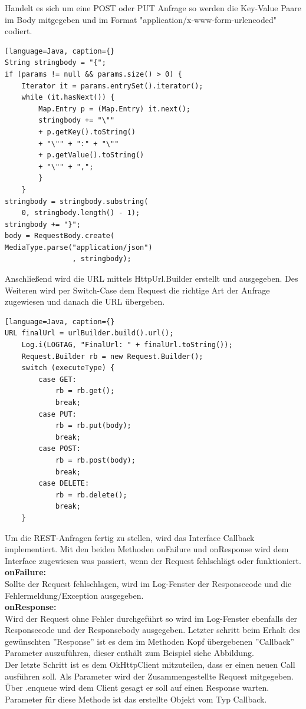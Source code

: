 Handelt es sich um eine POST oder PUT Anfrage so werden die Key-Value Paare im Body mitgegeben und im Format "application/x-www-form-urlencoded" codiert.
\begin{lstlisting}[language=Java, caption={}
String stringbody = "{";
if (params != null && params.size() > 0) {
  	Iterator it = params.entrySet().iterator();
    while (it.hasNext()) {
       	Map.Entry p = (Map.Entry) it.next();
        stringbody += "\"" 
        + p.getKey().toString() 
        + "\"" + ":" + "\"" 
        + p.getValue().toString() 
        + "\"" + ",";
        }
    }
stringbody = stringbody.substring(
  	0, stringbody.length() - 1);
stringbody += "}";
body = RequestBody.create(
MediaType.parse("application/json")
       			, stringbody);
\end{lstlisting}
Anschließend wird die URL mittels HttpUrl.Builder erstellt und ausgegeben. 
Des Weiteren wird per Switch-Case dem Request die richtige Art der Anfrage zugewiesen und danach die URL übergeben. 
\begin{lstlisting}[language=Java, caption={}
URL finalUrl = urlBuilder.build().url();
    Log.i(LOGTAG, "FinalUrl: " + finalUrl.toString());
    Request.Builder rb = new Request.Builder();
    switch (executeType) {
        case GET:
            rb = rb.get();
            break;
        case PUT:
            rb = rb.put(body);
            break;
        case POST:
            rb = rb.post(body);
            break;
        case DELETE:
            rb = rb.delete();
            break;
    }
\end{lstlisting}
Um die REST-Anfragen fertig zu stellen, wird das Interface Callback implementiert. Mit den beiden Methoden onFailure und onResponse wird dem Interface zugewiesen was passiert, wenn der Request fehlschlägt oder funktioniert. 
\\
\textbf{onFailure:}
\\
Sollte der Request fehlschlagen, wird im Log-Fenster der Responsecode und die Fehlermeldung/Exception ausgegeben. 
\\
\textbf{onResponse:}
\\
Wird der Request ohne Fehler durchgeführt so wird im Log-Fenster ebenfalls der Responsecode und der Responsebody ausgegeben. Letzter schritt beim Erhalt des gewünschten ''Response'' ist es dem im Methoden Kopf übergebenen ''Callback'' Parameter auszuführen, dieser enthält zum Beispiel siehe Abbildung.
\\
Der letzte Schritt ist es dem OkHttpClient mitzuteilen, dass er einen neuen Call ausführen soll. Als Parameter wird der Zusammengestellte Request mitgegeben. Über .enqueue wird dem Client gesagt er soll auf einen Response warten. Parameter für diese Methode ist das erstellte Objekt vom Typ Callback.
